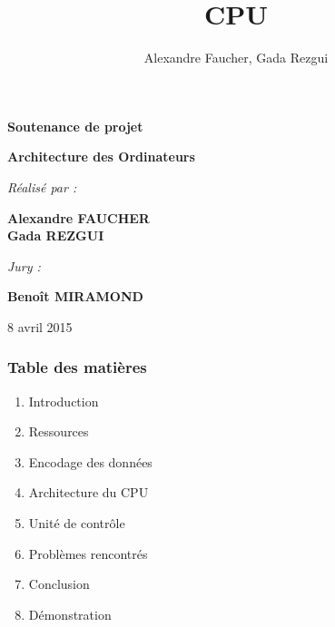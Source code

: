 \documentclass{beamer}
\title{CPU}
\author{Alexandre Faucher, Gada Rezgui}
\begin{document}

\begin{frame}
	\begin{center}

	{\Huge \textbf{Soutenance de projet}}

	\vspace*{0.3cm}

	{\large \textbf{Architecture des Ordinateurs}}

	\vspace*{0.5cm}

	\textit{Réalisé par :}

	{\large \textbf{Alexandre FAUCHER\\ Gada REZGUI}}

	\vspace*{0.5cm}

	\textit{Jury :}

	{\large \textbf{Benoît MIRAMOND}}

	\vspace*{0.5cm}

	{\large 8 avril 2015}

	\end{center}
\end{frame}



\begin{frame}
\frametitle{Table des matières}
\begin{enumerate}
	\item Introduction
	\item Ressources
	\item Encodage des données
	\item Architecture du CPU
	\item Unité de contrôle
	\item Problèmes rencontrés
	\item Conclusion
	\item Démonstration
\end{enumerate}
\end{frame}

\end{document}
